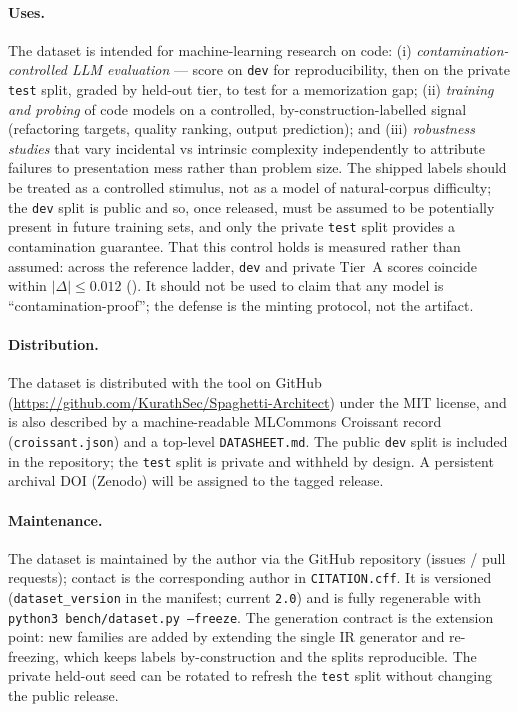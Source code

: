 \paragraph{Uses.}
The dataset is intended for machine-learning research on code: (i)
\emph{contamination-controlled LLM evaluation} --- score on \texttt{dev} for
reproducibility, then on the private \texttt{test} split, graded by held-out tier, to
test for a memorization gap; (ii) \emph{training and probing} of code models on a
controlled, by-construction-labelled signal (refactoring targets, quality ranking,
output prediction); and (iii) \emph{robustness studies} that vary incidental vs
intrinsic complexity independently to attribute failures to presentation mess rather
than problem size. The shipped labels should be treated as a controlled stimulus,
not as a model of natural-corpus difficulty; the \texttt{dev} split is public and so,
once released, must be assumed to be potentially present in future training sets, and
only the private \texttt{test} split provides a contamination guarantee. That this control
holds is measured rather than assumed: across the reference ladder, \texttt{dev} and private
Tier~A scores coincide within $|\Delta|\le 0.012$ (). It should not be
used to claim that any model is ``contamination-proof''; the defense is the minting
protocol, not the artifact.

\paragraph{Distribution.}
The dataset is distributed with the tool on GitHub
(\url{https://github.com/KurathSec/Spaghetti-Architect}) under the MIT license, and
is also described by a machine-readable MLCommons Croissant record
(\texttt{croissant.json}) and a top-level \texttt{DATASHEET.md}. The public
\texttt{dev} split is included in the repository; the \texttt{test} split is private
and withheld by design. A persistent archival DOI (Zenodo) will be assigned to the
tagged release.

\paragraph{Maintenance.}
The dataset is maintained by the author via the GitHub repository (issues / pull
requests); contact is the corresponding author in \texttt{CITATION.cff}. It is
versioned (\texttt{dataset\_version} in the manifest; current \texttt{2.0}) and is
fully regenerable with \texttt{python3 bench/dataset.py --freeze}. The generation
contract is the extension point: new families are added by extending the single IR
generator and re-freezing, which keeps labels by-construction and the splits
reproducible. The private held-out seed can be rotated to refresh the \texttt{test}
split without changing the public release.

